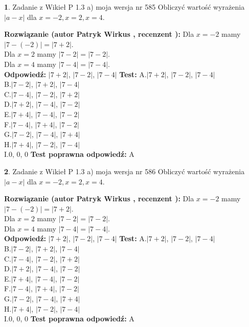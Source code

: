 \documentclass[12pt, a4paper]{article}
\theoremstyle{definition} %
\newtheorem{zad}{}
\newcommand{\zadStart}[1]{\begin{zad}#1\newline}
\newcommand{\zadStop}{\end{zad}}
\newcommand{\rozwStart}[2]{\noindent \textbf{Rozwiązanie (autor #1 , recenzent #2): }\newline}
\newcommand{\rozwStop}{\newline}
\newcommand{\odpStart}{\noindent \textbf{Odpowiedź:}\newline}
\newcommand{\odpStop}{\newline}
\newcommand{\testStart}{\noindent \textbf{Test:}\newline}
\newcommand{\testStop}{\newline}
\newcommand{\kluczStart}{\noindent \textbf{Test poprawna odpowiedź:}\newline}
\newcommand{\kluczStop}{\newline}
\begin{document}
\zadStart{Zadanie z Wikieł P 1.3 a) moja wersja nr 585}
Obliczyć wartość wyrażenia $|a - x|$ dla $x=-2,x=2,x=4$.
\zadStop
\rozwStart{Patryk Wirkus}{}
Dla $x = -2$ mamy $|7 - (-2)| = |7 + 2|$.\\
Dla $x = 2$ mamy $|7 - 2| = |7 - 2|$.\\
Dla $x = 4$ mamy $|7 - 4| = |7 - 4|$.\\
\rozwStop
\odpStart
$|7 + 2|$, $|7 - 2|$, $|7 - 4|$
\odpStop
\testStart
A.$|7 + 2|$, $|7 - 2|$, $|7 - 4|$\\
B.$|7 - 2|$, $|7 + 2|$, $|7 - 4|$\\
C.$|7 - 4|$, $|7 - 2|$, $|7 + 2|$\\
D.$|7 + 2|$, $|7 - 4|$, $|7 - 2|$\\
E.$|7 + 4|$, $|7 - 4|$, $|7 - 2|$\\
F.$|7 - 4|$, $|7 + 4|$, $|7 - 2|$\\
G.$|7 - 2|$, $|7 - 4|$, $|7 + 4|$\\
H.$|7 + 4|$, $|7 - 2|$, $|7 - 4|$\\
I.$0$, $0$, $0$
\testStop
\kluczStart
A
\kluczStop



\zadStart{Zadanie z Wikieł P 1.3 a) moja wersja nr 586}
Obliczyć wartość wyrażenia $|a - x|$ dla $x=-2,x=2,x=4$.
\zadStop
\rozwStart{Patryk Wirkus}{}
Dla $x = -2$ mamy $|7 - (-2)| = |7 + 2|$.\\
Dla $x = 2$ mamy $|7 - 2| = |7 - 2|$.\\
Dla $x = 4$ mamy $|7 - 4| = |7 - 4|$.\\
\rozwStop
\odpStart
$|7 + 2|$, $|7 - 2|$, $|7 - 4|$
\odpStop
\testStart
A.$|7 + 2|$, $|7 - 2|$, $|7 - 4|$\\
B.$|7 - 2|$, $|7 + 2|$, $|7 - 4|$\\
C.$|7 - 4|$, $|7 - 2|$, $|7 + 2|$\\
D.$|7 + 2|$, $|7 - 4|$, $|7 - 2|$\\
E.$|7 + 4|$, $|7 - 4|$, $|7 - 2|$\\
F.$|7 - 4|$, $|7 + 4|$, $|7 - 2|$\\
G.$|7 - 2|$, $|7 - 4|$, $|7 + 4|$\\
H.$|7 + 4|$, $|7 - 2|$, $|7 - 4|$\\
I.$0$, $0$, $0$
\testStop
\kluczStart
A
\kluczStop
\end{document}
